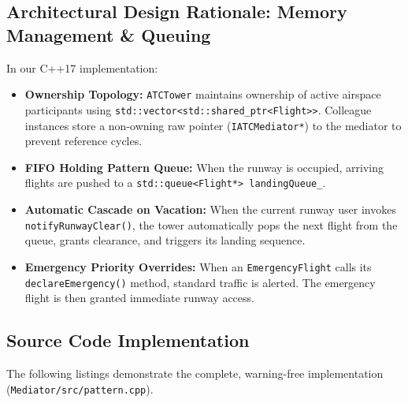 \documentclass[12pt,a4paper]{article}
\begin{document}
\subsection{Architectural Design Rationale: Memory Management \& Queuing}
In our C++17 implementation:
\begin{itemize}
    \item \textbf{Ownership Topology:} \texttt{ATCTower} maintains ownership of active airspace participants using \texttt{std::vector<std::shared\_ptr<Flight>>}. Colleague instances store a non-owning raw pointer (\texttt{IATCMediator*}) to the mediator to prevent reference cycles.
    \item \textbf{FIFO Holding Pattern Queue:} When the runway is occupied, arriving flights are pushed to a \texttt{std::queue<Flight*> landingQueue\_}.
    \item \textbf{Automatic Cascade on Vacation:} When the current runway user invokes \texttt{notifyRunwayClear()}, the tower automatically pops the next flight from the queue, grants clearance, and triggers its landing sequence.
    \item \textbf{Emergency Priority Overrides:} When an \texttt{EmergencyFlight} calls its \texttt{declareEmergency()} method, standard traffic is alerted. The emergency flight is then granted immediate runway access.
\end{itemize}

\subsection{Source Code Implementation}
The following listings demonstrate the complete, warning-free implementation (\texttt{Mediator/src/pattern.cpp}).
\end{document}
